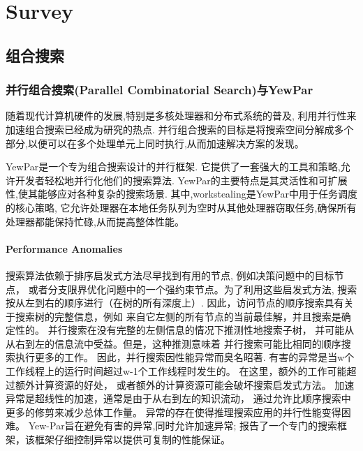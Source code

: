 \documentclass{mproj}
\begin{document}
\chapter{Survey}\label{survey}

\section{组合搜索}

\subsection{并行组合搜索(Parallel Combinatorial Search)与YewPar}
随着现代计算机硬件的发展,特别是多核处理器和分布式系统的普及,
利用并行性来加速组合搜索已经成为研究的热点.
并行组合搜索的目标是将搜索空间分解成多个部分,以便可以在多个处理单元上同时执行,从而加速解决方案的发现。

YewPar是一个专为组合搜索设计的并行框架.
它提供了一套强大的工具和策略,允许开发者轻松地并行化他们的搜索算法.
YewPar的主要特点是其灵活性和可扩展性,使其能够应对各种复杂的搜索场景.
其中,workstealing是YewPar中用于任务调度的核心策略,
它允许处理器在本地任务队列为空时从其他处理器窃取任务,确保所有处理器都能保持忙碌,从而提高整体性能。

\subsubsection{Performance Anomalies}
\label{sec:performance_anomalies}
搜索算法依赖于排序启发式方法尽早找到有用的节点,
例如决策问题中的目标节点，
或者分支限界优化问题中的一个强约束节点。为了利用这些启发式方法,
搜索按从左到右的顺序进行（在树的所有深度上）.
因此，访问节点的顺序搜索具有关于搜索树的完整信息，例如
来自它左侧的所有节点的当前最佳解，并且搜索是确定性的。
并行搜索在没有完整的左侧信息的情况下推测性地搜索子树，
并可能从从右到左的信息流中受益。但是，这种推测意味着
并行搜索可能比相同的顺序搜索执行更多的工作。
因此，并行搜索因性能异常而臭名昭著\cite{10.1007/3-540-60321-2_29}.
有害的异常是当w个工作线程上的运行时间超过w-1个工作线程时发生的。
在这里，额外的工作可能超过额外计算资源的好处，
或者额外的计算资源可能会破坏搜索启发式方法。
加速异常是超线性的加速，通常是由于从右到左的知识流动，
通过允许比顺序搜索中更多的修剪来减少总体工作量。
异常的存在使得推理搜索应用的并行性能变得困难。
Yew-Par旨在避免有害的异常,同时允许加速异常;
\cite{ARCHIBALD201892}报告了一个专门的搜索框架，该框架仔细控制异常以提供可复制的性能保证。
\end{document}
